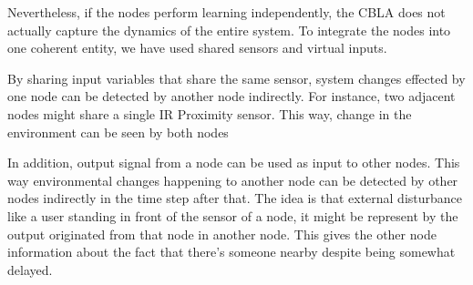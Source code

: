 Nevertheless, if the nodes perform learning independently, the CBLA does not actually capture the dynamics of the entire system. To integrate the nodes into one coherent entity, we have used shared sensors and virtual inputs.

By sharing input variables that share the same sensor, system changes effected by one node can be detected by another node indirectly. For instance, two adjacent nodes might share a single IR Proximity sensor. This way, change in the environment can be seen by both nodes

In addition, output signal from a node can be used as input to other nodes. This way environmental changes happening to another node can be detected by other nodes indirectly in the time step after that. The idea is that external disturbance like a user standing in front of the sensor of a node, it might be represent by the output originated from  that node in another node. This gives the other node information about the fact that there's someone nearby despite being somewhat delayed. 

